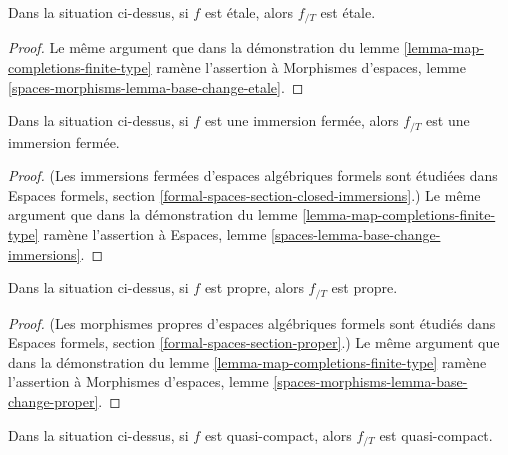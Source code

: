\begin{lemma}
\label{lemma-map-completions-etale}
Dans la situation ci-dessus, si $f$ est étale, alors $f_{/T}$ est étale.
\end{lemma}

\begin{proof}
Le même argument que dans la démonstration du
lemme \ref{lemma-map-completions-finite-type} ramène l'assertion à
Morphismes d'espaces, lemme \ref{spaces-morphisms-lemma-base-change-etale}.
\end{proof}

\begin{lemma}
\label{lemma-closed-immersion-gives-closed-immersion}
Dans la situation ci-dessus, si $f$ est une immersion fermée, alors
$f_{/T}$ est une immersion fermée.
\end{lemma}

\begin{proof}
(Les immersions fermées d'espaces algébriques formels sont étudiées dans
Espaces formels, section
\ref{formal-spaces-section-closed-immersions}.)
Le même argument que dans la démonstration du
lemme \ref{lemma-map-completions-finite-type} ramène l'assertion à
Espaces, lemme
\ref{spaces-lemma-base-change-immersions}.
\end{proof}

\begin{lemma}
\label{lemma-proper-gives-proper}
Dans la situation ci-dessus, si $f$ est propre, alors $f_{/T}$ est propre.
\end{lemma}

\begin{proof}
(Les morphismes propres d'espaces algébriques formels sont étudiés dans
Espaces formels, section \ref{formal-spaces-section-proper}.)
Le même argument que dans la démonstration du
lemme \ref{lemma-map-completions-finite-type} ramène l'assertion à
Morphismes d'espaces, lemme
\ref{spaces-morphisms-lemma-base-change-proper}.
\end{proof}

\begin{lemma}
\label{lemma-quasi-compact-gives-quasi-compact}
Dans la situation ci-dessus, si $f$ est quasi-compact, alors
$f_{/T}$ est quasi-compact.
\end{lemma}


